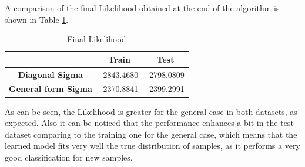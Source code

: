 \documentclass[12pt]{article}
\begin{document}
A comparison of the final Likelihood obtained at the end of the algorithm is shown in Table \ref{tab:Likelihood}.
\begin{table}[h!]
\centering
	\begin{tabular}{c|c|c|} 
	\cline{2-3}
	& \multicolumn{1}{c|}{\cellcolor[gray]{0.7} \textbf{Train}}  
	& \multicolumn{1}{c|}{\cellcolor[gray]{0.7} \textbf{Test}}
	\\ \hline
	
	\multicolumn{1}{|c|}{\cellcolor[gray]{0.8} \textbf{Diagonal Sigma}}   & -2843.4680 & -2798.0809 \\ \hline
	\multicolumn{1}{|c|}{\cellcolor[gray]{0.8} \textbf{General form Sigma}}   & -2370.8841
	 & -2399.2991 \\ \hline
	
	\end{tabular} 
	\caption{Final Likelihood}
	\label{tab:Likelihood}
\end{table}
As can be seen, the Likelihood is greater for the general case in both datasets, as expected. Also it can be noticed that the performance enhances a bit in the test dataset comparing to the training one for the general case, which means that the learned model fits very well the true distribution of samples, as it performs a very good classification for new samples.
\end{document}

